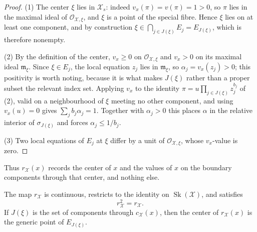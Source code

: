 \begin{proof}
(1) The center $\xi$ lies in $\mathcal X_s$: indeed
$v_x(\pi)=v(\pi)=1>0$, so $\pi$ lies in the maximal ideal of
$\mathcal O_{\mathcal X,\xi}$, and $\xi$ is a point of the special
fibre. Hence $\xi$ lies on at least one component, and by construction
$\xi\in\bigcap_{j\in J(\xi)}E_j=E_{J(\xi)}$, which is therefore nonempty.

(2) By the definition of the center, $v_x\ge0$ on
$\mathcal O_{\mathcal X,\xi}$ and $v_x>0$ on its maximal ideal
$\mathfrak m_\xi$. Since $\xi\in E_j$, the local equation $z_j$ lies
in $\mathfrak m_\xi$, so $\alpha_j=v_x(z_j)>0$; this positivity is worth
noting, because it is what makes $J(\xi)$ rather than a proper subset the
relevant index set. Applying
$v_x$ to the identity $\pi=u\prod_{j\in J(\xi)}z_j^{b_j}$ of
\,(2), valid on a neighbourhood of $\xi$
meeting no other component, and using
$v_x(u)=0$ gives $\sum_jb_j\alpha_j=1$. Together with
$\alpha_j>0$ this places $\alpha$ in the relative interior of
$\sigma_{J(\xi)}$ and forces $\alpha_j\le1/b_j$.

(3) Two local equations of $E_j$ at $\xi$ differ by a unit of
$\mathcal O_{\mathcal X,\xi}$, whose $v_x$-value is zero.
\end{proof}

Thus $r_{\mathcal X}(x)$ records the center of $x$ and the values of
$x$ on the boundary components through that center, and nothing else.

\begin{proposition}
\label{prop:skeleton-retraction}
The map $r_{\mathcal X}$ is continuous, restricts to the identity on
$\operatorname{Sk}(\mathcal X)$, and satisfies
\[
                       r_{\mathcal X}^2=r_{\mathcal X}.
\]
If $J(\xi)$ is the set of components through $c_{\mathcal X}(x)$, then
the center of $r_{\mathcal X}(x)$ is the generic point of $E_{J(\xi)}$.
\end{proposition}

